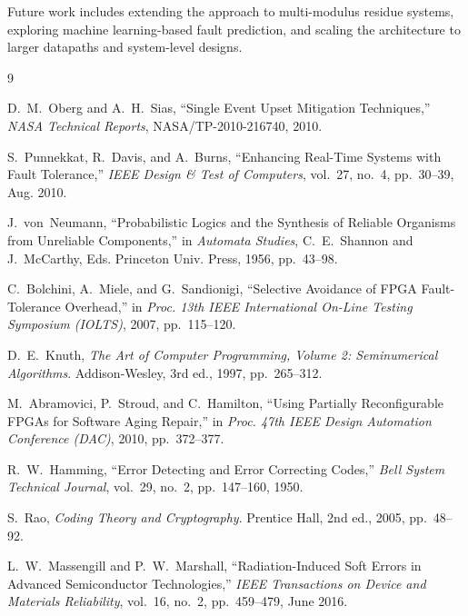 \documentclass[conference]{IEEEtran}
\begin{document}
Future work includes extending the approach to multi-modulus residue systems, exploring machine learning-based fault prediction, and scaling the architecture to larger datapaths and system-level designs.
\begin{thebibliography}{9}

D.~M.~Oberg and A.~H.~Sias, ``Single Event Upset Mitigation Techniques,'' 
\textit{NASA Technical Reports}, NASA/TP-2010-216740, 2010.

S.~Punnekkat, R.~Davis, and A.~Burns, ``Enhancing Real-Time Systems with Fault Tolerance,'' 
\textit{IEEE Design \& Test of Computers}, vol.~27, no.~4, pp.~30--39, Aug. 2010.

J.~von~Neumann, ``Probabilistic Logics and the Synthesis of Reliable Organisms from Unreliable Components,'' 
in \textit{Automata Studies}, C.~E.~Shannon and J.~McCarthy, Eds. Princeton Univ. Press, 1956, pp.~43--98.

C.~Bolchini, A.~Miele, and G.~Sandionigi, ``Selective Avoidance of FPGA Fault-Tolerance Overhead,'' 
in \textit{Proc. 13th IEEE International On-Line Testing Symposium (IOLTS)}, 2007, pp.~115--120.

D.~E.~Knuth, \textit{The Art of Computer Programming, Volume 2: Seminumerical Algorithms}. 
Addison-Wesley, 3rd ed., 1997, pp.~265--312.

M.~Abramovici, P.~Stroud, and C.~Hamilton, ``Using Partially Reconfigurable FPGAs for Software Aging Repair,'' 
in \textit{Proc. 47th IEEE Design Automation Conference (DAC)}, 2010, pp.~372--377.

R.~W.~Hamming, ``Error Detecting and Error Correcting Codes,'' 
\textit{Bell System Technical Journal}, vol.~29, no.~2, pp.~147--160, 1950.

S.~Rao, \textit{Coding Theory and Cryptography}. Prentice Hall, 2nd ed., 2005, pp.~48--92.

L.~W.~Massengill and P.~W.~Marshall, ``Radiation-Induced Soft Errors in Advanced Semiconductor Technologies,'' 
\textit{IEEE Transactions on Device and Materials Reliability}, vol.~16, no.~2, pp.~459--479, June 2016.

\end{thebibliography}
\end{document}
